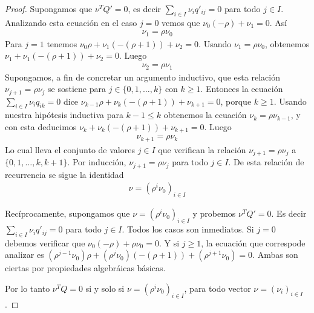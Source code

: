 \documentclass{article}
\theoremstyle{definition}
\begin{document}
\begin{proof}
Supongamos que \(\nu^T Q' = 0\), es decir \(\sum_{i \in I} \nu_i q'_{i j} =0\) para todo \(j \in I\).
Analizando esta ecuación en el caso \(j = 0\) vemos que \(\nu_0 (- \rho) + \nu_1 = 0\).
Así
\begin{align}
	\nu_1 = \rho \nu_0
\end{align}
Para \(j = 1\) tenemos \(\nu_0 \rho + \nu_1 (- (\rho + 1)) + \nu_2 = 0\).
Usando \(\nu_1 = \rho \nu_0\), obtenemos \(\nu_1 + \nu_1 (- (\rho + 1)) + \nu_2 = 0\).
Luego 
\begin{align}
	\nu_2 = \rho \nu_1
\end{align}
Supongamos, a fin de concretar un argumento inductivo, que esta relación \(\nu_{j + 1} = \rho \nu_j\) se sostiene para \(j \in \{0, 1, \dots, k\}\) con \(k \geq 1\).
Entonces la ecuación \(\sum_{i \in I} \nu_i q_{i k} = 0\) dice \(\nu_{k - 1} \rho + \nu_k (- (\rho + 1)) + \nu_{k + 1} = 0\), porque \(k \geq 1\).
Usando nuestra hipótesis inductiva para \(k - 1 \leq k\) obtenemos la ecuación \(\nu_k = \rho \nu_{k - 1}\), y con esta deducimos \(\nu_k + \nu_k (- (\rho + 1)) + \nu_{k + 1} = 0\).
Luego
\begin{align}
	\nu_{k + 1} = \rho \nu_k
\end{align}
Lo cual lleva el conjunto de valores \(j \in I\) que verifican la relación \(\nu_{j + 1} = \rho \nu_j\) a \(\{0, 1, \dots, k, k + 1\}\).
Por inducción, \(\nu_{j + 1} = \rho \nu_j\) para todo \(j \in I\).
De esta relación de recurrencia se sigue la identidad 
\begin{align}
	\nu = (\rho^i \nu_0)_{i \in I}
\end{align}

Recíprocamente, supongamos que \(\nu = (\rho^i \nu_0)_{i \in I}\) y probemos \(\nu^T Q' = 0\).
Es decir \(\sum_{i \in I} \nu_i q'_{i j} = 0\) para todo \(j \in I\).
Todos los casos son inmediatos.
Si \(j = 0\) debemos verificar que \(\nu_0 (- \rho) + \rho \nu_0 = 0\).
Y si \(j \geq 1\), la ecuación que correspode analizar es \((\rho^{j - 1} \nu_0) \rho + (\rho^j \nu_0) (- (\rho + 1)) + (\rho^{j + 1} \nu_0) = 0\).
Ambas son ciertas por propiedades algebráicas básicas.

Por lo tanto \(\nu^T Q = 0\) si y solo si \(\nu = (\rho^i \nu_0)_{i \in I}\), para todo vector \(\nu = (\nu_i)_{i \in I}\).


\end{proof}
\end{document}
